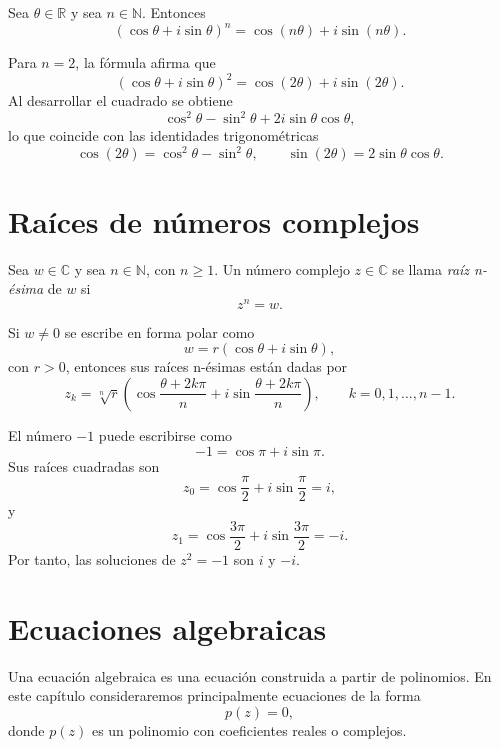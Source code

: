\begin{teorema}
Sea \(\theta\in\mathbb{R}\) y sea \(n\in\mathbb{N}\). Entonces
\[
  (\cos\theta+i\sin\theta)^n=\cos(n\theta)+i\sin(n\theta).
\]
\end{teorema}

\begin{ejemplo}
Para \(n=2\), la fórmula afirma que
\[
  (\cos\theta+i\sin\theta)^2=\cos(2\theta)+i\sin(2\theta).
\]
Al desarrollar el cuadrado se obtiene
\[
  \cos^2\theta-\sin^2\theta+2i\sin\theta\cos\theta,
\]
lo que coincide con las identidades trigonométricas
\[
  \cos(2\theta)=\cos^2\theta-\sin^2\theta,
  \qquad
  \sin(2\theta)=2\sin\theta\cos\theta.
\]
\end{ejemplo}

\section{Raíces de números complejos}

\begin{definicion}
Sea \(w\in\mathbb{C}\) y sea \(n\in\mathbb{N}\), con \(n\geq 1\). Un número complejo \(z\in\mathbb{C}\) se llama \emph{raíz n-ésima} de \(w\) si
\[
  z^n=w.
\]
\end{definicion}

Si \(w\neq 0\) se escribe en forma polar como
\[
  w=r(\cos\theta+i\sin\theta),
\]
con \(r>0\), entonces sus raíces n-ésimas están dadas por
\[
  z_k=\sqrt[n]{r}\left(\cos\frac{\theta+2k\pi}{n}
  +i\sin\frac{\theta+2k\pi}{n}\right),
  \qquad k=0,1,\dots,n-1.
\]

\begin{ejemplo}
El número \(-1\) puede escribirse como
\[
  -1=\cos\pi+i\sin\pi.
\]
Sus raíces cuadradas son
\[
  z_0=\cos\frac{\pi}{2}+i\sin\frac{\pi}{2}=i,
\]
y
\[
  z_1=\cos\frac{3\pi}{2}+i\sin\frac{3\pi}{2}=-i.
\]
Por tanto, las soluciones de \(z^2=-1\) son \(i\) y \(-i\).
\end{ejemplo}

\section{Ecuaciones algebraicas}

Una ecuación algebraica es una ecuación construida a partir de polinomios. En este capítulo consideraremos principalmente ecuaciones de la forma
\[
  p(z)=0,
\]
donde \(p(z)\) es un polinomio con coeficientes reales o complejos.

